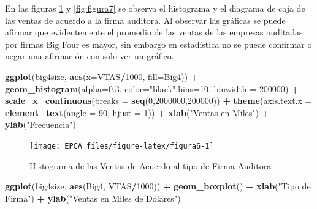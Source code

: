 \documentclass[letterpaper,]{book}
\newenvironment{Shaded}{\begin{snugshade}}{\end{snugshade}}
\newcommand{\DataTypeTok}[1]{\textcolor[rgb]{0.13,0.29,0.53}{#1}}
\newcommand{\DecValTok}[1]{\textcolor[rgb]{0.00,0.00,0.81}{#1}}
\newcommand{\FloatTok}[1]{\textcolor[rgb]{0.00,0.00,0.81}{#1}}
\newcommand{\KeywordTok}[1]{\textcolor[rgb]{0.13,0.29,0.53}{\textbf{#1}}}
\newcommand{\NormalTok}[1]{#1}
\newcommand{\OperatorTok}[1]{\textcolor[rgb]{0.81,0.36,0.00}{\textbf{#1}}}
\newcommand{\StringTok}[1]{\textcolor[rgb]{0.31,0.60,0.02}{#1}}
\begin{document}
En las figuras \ref{fig:figura6} y \ref{fig:figura7} se observa el histograma y el diagrama de caja de las ventas de acuerdo a la firma auditora. Al observar las gráficas se puede afirmar que evidentemente el promedio de las ventas de las empresas auditadas por firmas Big Four es mayor, sin embargo en estadística no se puede confirmar o negar una afirmación con solo ver un gráfico.

\begin{Shaded}
\begin{Highlighting}[]
\KeywordTok{ggplot}\NormalTok{(big4size, }\KeywordTok{aes}\NormalTok{(}\DataTypeTok{x=}\NormalTok{VTAS}\OperatorTok{/}\DecValTok{1000}\NormalTok{, }\DataTypeTok{fill=}\NormalTok{Big4)) }\OperatorTok{+}\StringTok{ }
\StringTok{  }\KeywordTok{geom_histogram}\NormalTok{(}\DataTypeTok{alpha=}\FloatTok{0.3}\NormalTok{, }\DataTypeTok{color=}\StringTok{"black"}\NormalTok{,}\DataTypeTok{bins=}\DecValTok{10}\NormalTok{, }\DataTypeTok{binwidth =} \DecValTok{200000}\NormalTok{) }\OperatorTok{+}
\StringTok{  }\KeywordTok{scale_x_continuous}\NormalTok{(}\DataTypeTok{breaks =} \KeywordTok{seq}\NormalTok{(}\DecValTok{0}\NormalTok{,}\DecValTok{2000000}\NormalTok{,}\DecValTok{200000}\NormalTok{)) }\OperatorTok{+}
\StringTok{  }\KeywordTok{theme}\NormalTok{(}\DataTypeTok{axis.text.x =} \KeywordTok{element_text}\NormalTok{(}\DataTypeTok{angle =} \DecValTok{90}\NormalTok{, }\DataTypeTok{hjust =} \DecValTok{1}\NormalTok{)) }\OperatorTok{+}
\StringTok{  }\KeywordTok{xlab}\NormalTok{(}\StringTok{"Ventas en Miles"}\NormalTok{) }\OperatorTok{+}\StringTok{ }\KeywordTok{ylab}\NormalTok{(}\StringTok{"Frecuencia"}\NormalTok{) }
\end{Highlighting}
\end{Shaded}

\begin{figure}[h!]

{\centering \texttt{[image: EPCA\_files/figure-latex/figura6-1]} 

}

\caption{Histograma de las Ventas de Acuerdo al tipo de Firma Auditora}\label{fig:figura6}
\end{figure}

\begin{Shaded}
\begin{Highlighting}[]
\KeywordTok{ggplot}\NormalTok{(big4size, }\KeywordTok{aes}\NormalTok{(Big4, VTAS}\OperatorTok{/}\DecValTok{1000}\NormalTok{)) }\OperatorTok{+}\StringTok{ }
\StringTok{  }\KeywordTok{geom_boxplot}\NormalTok{() }\OperatorTok{+}\StringTok{ }\KeywordTok{xlab}\NormalTok{(}\StringTok{"Tipo de Firma"}\NormalTok{) }\OperatorTok{+}
\StringTok{  }\KeywordTok{ylab}\NormalTok{(}\StringTok{"Ventas en Miles de Dólares")}
\end{Highlighting}
\end{Shaded}
\end{document}
